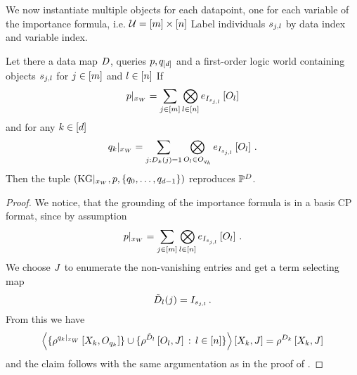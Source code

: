 %
We now instantiate multiple objects for each datapoint, one for each variable of the importance formula, i.e. $\mathcal{U}=[m]\times[n]$
Label individuals $s_{j,l}$ by data index and variable index.

\begin{lemma}
    Let there a data map $D$, queries $p,q_{[d]}$ and a first-order logic world containing objects $s_{j,l}$ for $j\in[m]$ and $l\in[n]$
    If
    \begin{align*}
        {p}|_{x_{W}}
        = \sum_{j\in[m]} \bigotimes_{l\in[n]} e_{I_{s_{j,l}}}\left[O_{l}\right]
    \end{align*}
    and for any $k\in[d]$
    \begin{align*}
        {q_{k}}|_{x_{W}}
        = \sum_{j : D_{k}(j)=1} \bigotimes_{O_{l} \in O_{q_{k}}}
        e_{I_{s_{j,l}}}\left[O_{l}\right] \, .
    \end{align*}
    Then the tuple $(\mathrm{KG}|_{x_{W}},p,\{q_{0},\ldots,q_{d-1}\})$ reproduces $\mathbb{P}^{D}$.
\end{lemma}
\begin{proof}
    We notice, that the grounding of the importance formula is in a basis CP format, since by assumption
    \begin{align*}
        {p}|_{x_{W}}
        = \sum_{j\in[m]} \bigotimes_{l\in[n]} e_{I_{s_{j,l}}}\left[O_{l}\right] \, .
    \end{align*}
    We choose $J$ to enumerate the non-vanishing entries and get a term selecting map
    \begin{align*}
        \tilde{D}_{l}(j) = I_{s_{j,l}} \, .
    \end{align*}
    From this we have
    \begin{align*}
        \left\langle 
            \{\rho^{{q_{k}}|_{x_{W}}}\left[X_{k},O_{q_{k}}\right]\} \cup
            \{\rho^{\tilde{D}_{l}}\left[O_{l},J\right] \, : \, l\in[n]\}
        \right\rangle \left[ X_{k},J \right]
        = \rho^{D_{k}}\left[X_{k},J\right]
    \end{align*}
    and the claim follows with the same argumentation as in the proof of .
\end{proof}


